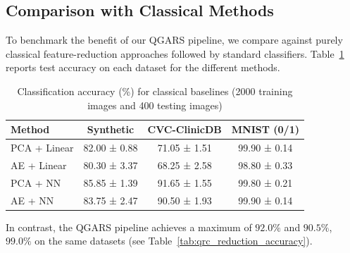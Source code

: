 \documentclass[conference]{IEEEtran}
\begin{document}




\subsection{Comparison with Classical Methods}
To benchmark the benefit of our QGARS pipeline, 
we compare against purely classical feature-reduction 
approaches followed by standard classifiers. 
Table~\ref{tab:classical_comp} reports test accuracy on each dataset 
for the different methods.

\begin{table}[tb]
  \caption{Classification accuracy (\%) for classical baselines (2000 training images and 400 testing images)}
  \label{tab:classical_comp}
  \centering
  \begin{tabular}{lccc}
    \hline
    Method            & Synthetic & CVC-ClinicDB & MNIST (0/1) \\
    \hline
    PCA + Linear      &  82.00 ± 0.88    &  71.05 ± 1.51   &  99.90 ± 0.14   \\
    AE + Linear       &  80.30 ± 3.37    &  68.25 ± 2.58   &  98.80 ± 0.33   \\
    PCA + NN          &  85.85 ± 1.39   &  91.65 ± 1.55   &  99.80 ± 0.21    \\
    AE + NN           &  83.75 ± 2.47    &  90.50 ± 1.93   &  99.90 ± 0.14    \\
    \hline
  \end{tabular}
\end{table}

\noindent
In contrast, the QGARS pipeline achieves a maximum of $\mathbf{92.0\%}$ and $\mathbf{90.5\%}$, $\mathbf{99.0\%}$ on the same datasets (see Table~\ref{tab:qrc_reduction_accuracy}).
\end{document}
